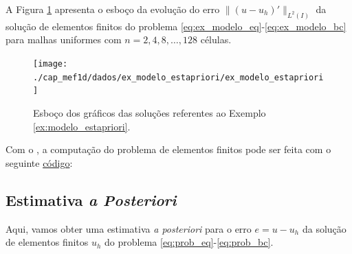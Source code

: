 \begin{ex}\label{ex:modelo_estapriori}
  A Figura \ref{fig:ex_modelo_estapriori} apresenta o esboço da evolução do erro $\|(u - u_h)'\|_{L^2(I)}$ da solução de elementos finitos do problema \eqref{eq:ex_modelo_eq}-\eqref{eq:ex_modelo_bc} para malhas uniformes com $n=2, 4, 8, \ldots, 128$ células.

\begin{figure}[h!]
  \centering
  \texttt{[image: ./cap\_mef1d/dados/ex\_modelo\_estapriori/ex\_modelo\_estapriori]}
  \caption{Esboço dos gráficos das soluções referentes ao Exemplo \ref{ex:modelo_estapriori}.}
  \label{fig:ex_modelo_estapriori}
\end{figure}

\ifispython
Com o \fenics, a computação do problema de elementos finitos pode ser feita com o seguinte \href{https://github.com/phkonzen/notas/blob/master/src/MetodoElementosFinitos/cap_mef1d/dados/ex_modelo_estapriori/ex_modelo_estapriori.py}{código}:

\fi
\end{ex}

\subsection{Estimativa \textit{a Posteriori}}

Aqui, vamos obter uma estimativa \textit{a posteriori} para o erro $e = u - u_h$ da solução de elementos finitos $u_h$ do problema \eqref{eq:prob_eq}-\eqref{eq:prob_bc}.

